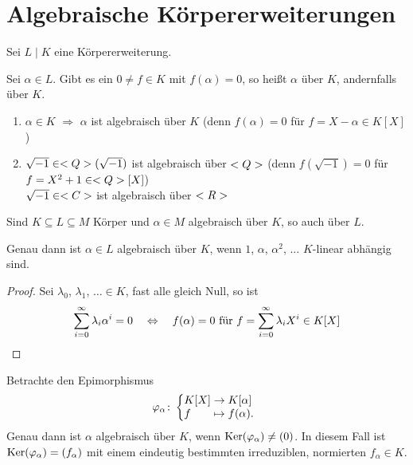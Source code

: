 \section{Algebraische Körpererweiterungen} \label{sec:sec_2}

Sei $L \mid K$ eine Körpererweiterung.

\begin{definition}
	Sei $\alpha \in L$. Gibt es ein $0 \neq f \in K$ mit $f(\alpha) = 0$, so heißt $\alpha$  über $K$, andernfalls  über $K$.
\end{definition}

\begin{example}
	\begin{enumerate}[label=(\alph*)]
		\item $\alpha \in K$ $\Rightarrow$ $\alpha$ ist algebraisch über $K$ (denn $f(\alpha) = 0$ für $f = X - \alpha \in K[X]$)
		\item $\sqrt{-1} \in <Q>(\sqrt{-1})$ ist algebraisch über $<Q>$ (denn $f(\sqrt{-1})=0$ für $f = X^2 + 1 \in <Q>[X]$) \\
		$\sqrt{-1} \in <C>$ ist algebraisch über $<R>$        
	\end{enumerate}
\end{example}

\begin{remark}
	Sind $K \subseteq L \subseteq M$ Körper und $\alpha \in M$ algebraisch über $K$, so auch über $L$.
\end{remark}

\begin{lemma} 
	Genau dann ist $\alpha \in L$ algebraisch über $K$, wenn $1$, $\alpha$, $\alpha^2$, $\dots$ $K$-linear abhängig sind.
\end{lemma}

\begin{proof}
	Sei $\lambda_0$, $\lambda_1$, $\ldots \in K$, fast alle gleich Null, so ist
	\begin{align}
	\sum_{i=0}^\infty \lambda_i \alpha^i = 0\quad \Leftrightarrow\quad f(\alpha) = 0 \text{ für } f = \sum_{i=0}^\infty \lambda_i X^i \in K[X]\notag
	\end{align}
\end{proof}

\begin{lemma}
	Betrachte den Epimorphismus \begin{align*}
	\phi_{\alpha}\colon \left\lbrace\begin{array}{@{}l@{\;}c@{\;}l}
	K[X] &\to & K[\alpha]\\
	f &\mapsto & f(\alpha).
	\end{array}\right.
	\end{align*}
	Genau dann ist $\alpha$ algebraisch über $K$, wenn $\operatorname{Ker}(\varphi_\alpha) \neq (0)$. In diesem Fall ist $\operatorname{Ker}(\varphi_\alpha) = (f_\alpha)$ mit einem eindeutig bestimmten irreduziblen, normierten $f_\alpha \in K$.
\end{lemma}

